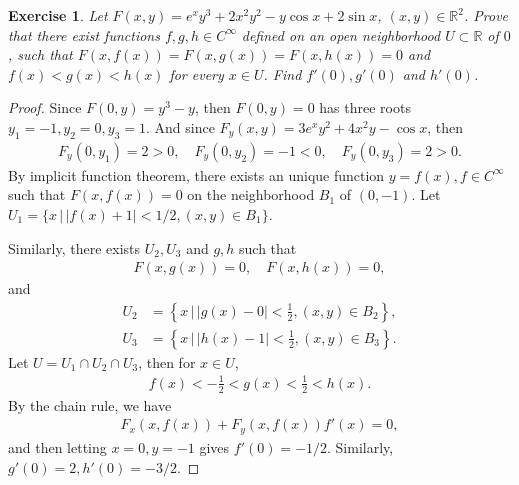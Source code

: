 \documentclass[11pt]{article}
\newtheorem{exercise}{Exercise}[section]
\theoremstyle{definition}
\numberwithin{equation}{subsection}
\begin{document}
\begin{exercise}
Let $F(x, y) = e^x y^3 + 2x^2 y^2 - y \cos x + 2 \sin x$, $(x, y) \in \mathbb{R}^2$. Prove that there exist functions $f, g, h \in C^\infty$ defined on an open neighborhood $U \subset \mathbb{R}$ of $0$, such that $F(x,f(x)) = F(x,g(x)) = F(x,h(x)) = 0$ and $f(x) < g(x) < h(x)$ for every $x \in U$. Find $f'(0), g'(0)$ and $h'(0)$.
\end{exercise}
\begin{proof}
Since $F(0,y) = y^3 - y$, then $F(0,y) = 0$ has three roots $y_1 = -1, y_2 = 0, y_3 = 1$. And since $F_y(x, y) = 3e^xy^2 + 4x^2y - \cos x$, then
\begin{align*}
    F_y(0, y_1) = 2 > 0, \quad F_y(0, y_2) = -1 < 0, \quad F_y(0, y_3) = 2 > 0.
\end{align*}
By implicit function theorem, there exists an unique function $y = f(x), f \in C^\infty$ such that $F(x, f(x)) = 0$ on the neighborhood $B_1$ of $(0, -1)$. Let $U_1 = \{x \, |\, |f(x) + 1| < 1/2, (x, y) \in B_1\}$.

Similarly, there exists $U_2, U_3$ and $g, h$ such that
\begin{align*}
    F(x, g(x)) = 0, \quad F(x, h(x)) = 0,
\end{align*}
and 
\begin{align*}
    U_2 & = \left\{x \, \Bigg|\, |g(x) - 0| < \frac{1}{2}, (x, y) \in B_2\right\}, \\
    U_3 & = \left\{x \, \Bigg|\, |h(x) - 1| < \frac{1}{2}, (x, y) \in B_3\right\}.
\end{align*}
Let $U = U_1 \cap U_2 \cap U_3$, then for $x \in U$,
\begin{align*}
    f(x) < -\frac{1}{2} < g(x) < \frac{1}{2} < h(x).
\end{align*}
By the chain rule, we have
\begin{align*}
    F_x(x, f(x)) + F_y(x, f(x))f'(x) = 0,
\end{align*}
and then letting $x = 0, y = -1$ gives $f'(0) = - 1/2$. Similarly, $g'(0) = 2, h'(0) = - 3/2$.
\end{proof}

\medskip
\end{document}
